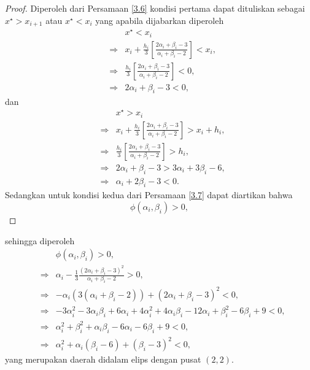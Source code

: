 \begin{proof}
Diperoleh dari Persamaan \eqref{3.6} kondisi pertama dapat dituliskan sebagai $x^\star > x_{i+1}$ atau $x^\star < x_{i}$ yang apabila dijabarkan diperoleh
        \begin{align*}
             &&x^\star < x_i \\
             &\Rightarrow&x_i + \frac{h_i}{3}[\frac{2\alpha_i + \beta_i - 3}{\alpha_i + \beta_i - 2}] < x_i,\\
             &\Rightarrow&\frac{h_i}{3}[\frac{2\alpha_i + \beta_i - 3}{\alpha_i + \beta_i - 2}] < 0,\\
             &\Rightarrow&2\alpha_i+\beta_i-3 < 0,
        \end{align*}
dan
\begin{align*}
             &&x^\star > x_i \\
             &\Rightarrow&x_i + \frac{h_i}{3}[\frac{2\alpha_i + \beta_i - 3}{\alpha_i + \beta_i - 2}] > x_i + h_i,\\
             &\Rightarrow&\frac{h_i}{3}[\frac{2\alpha_i + \beta_i - 3}{\alpha_i + \beta_i - 2}] > h_i,\\
             &\Rightarrow&2\alpha_i + \beta_i - 3 > 3\alpha_i+3\beta_i-6,\\
             &\Rightarrow&\alpha_i+2\beta_i-3 < 0.
        \end{align*} 
Sedangkan untuk kondisi kedua dari Persamaan \eqref{3.7} dapat diartikan bahwa $$\phi(\alpha_i, \beta_i) > 0,$$
\end{proof}
sehingga diperoleh
\begin{align*}
    &&\phi(\alpha_i, \beta_i) > 0, \\
    &\Rightarrow&\alpha_i - \frac{1}{3}\frac{(2\alpha_i + \beta_i -3)^2}{\alpha_i + \beta_i - 2}>0, \\
    &\Rightarrow&-\alpha_i(3(\alpha_i + \beta_i -2)) + (2\alpha_i + \beta_i - 3)^2 < 0, \\
    &\Rightarrow&-3\alpha_i^2 - 3 \alpha_i\beta_i + 6 \alpha_i + 4\alpha_i^2 + 4\alpha_i\beta_i - 12\alpha_i + \beta_i^2 - 6\beta_i + 9 < 0, \\
    &\Rightarrow&\alpha_i^2 + \beta_i^2 + \alpha_i\beta_i - 6\alpha_i -6\beta_i + 9 < 0, \\
    &\Rightarrow&\alpha_i^2 + \alpha_i(\beta_i - 6) + (\beta_i - 3)^2 < 0,
\end{align*}
yang merupakan daerah didalam elips dengan pusat $(2,2)$. 
